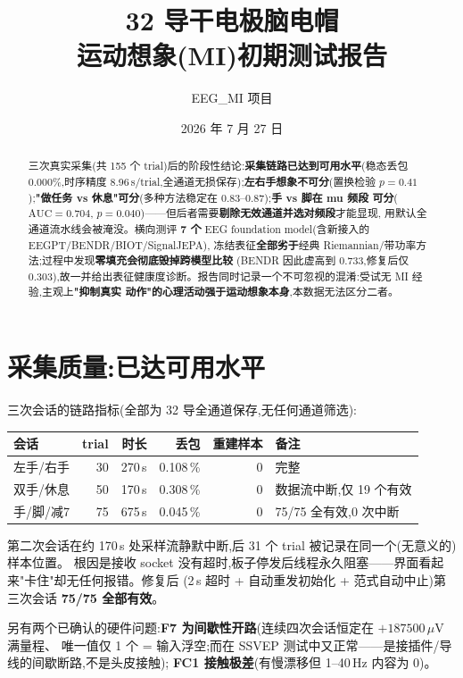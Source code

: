 \documentclass[11pt]{ctexart}
\title{\bfseries 32 导干电极脑电帽\\运动想象(MI)初期测试报告}
\author{EEG\_MI 项目}
\date{2026 年 7 月 27 日}
\begin{document}
\maketitle

\begin{abstract}
\noindent
三次真实采集(共 155 个 trial)后的阶段性结论:\textbf{采集链路已达到可用水平}(稳态丢包
0.000\%,时序精度 8.96\,s/trial,全通道无损保存);\textbf{左右手想象不可分}(置换检验
$p=0.41$);\textbf{"做任务 vs 休息"可分}(多种方法稳定在 0.83–0.87);\textbf{手 vs 脚在 mu 频段
可分}($\mathrm{AUC}=0.704$, $p=0.040$)——但后者需要\textbf{剔除无效通道并选对频段}才能显现,
用默认全通道流水线会被淹没。横向测评 \textbf{7 个} EEG foundation model(含新接入的 EEGPT/BENDR/BIOT/SignalJEPA),
冻结表征\textbf{全部劣于}经典 Riemannian/带功率方法;过程中发现\textbf{零填充会彻底毁掉跨模型比较}
(BENDR 因此虚高到 0.733,修复后仅 0.303),故一并给出表征健康度诊断。报告同时记录一个不可忽视的混淆:受试无 MI 经验,主观上\textbf{"抑制真实
动作"的心理活动强于运动想象本身},本数据无法区分二者。
\end{abstract}

\section{采集质量:已达可用水平}
三次会话的链路指标(全部为 32 导全通道保存,无任何通道筛选):

\begin{center}\small
\begin{tabular}{@{}lrrrrl@{}}
\toprule
会话 & trial & 时长 & 丢包 & 重建样本 & 备注 \\
\midrule
左手/右手      & 30 & 270\,s & 0.108\,\% & 0 & 完整 \\
双手/休息      & 50 & 170\,s & 0.308\,\% & 0 & \textcolor{bad}{数据流中断,仅 19 个有效} \\
手/脚/减7      & 75 & 675\,s & 0.045\,\% & 0 & \textcolor{good}{75/75 全有效,0 次中断} \\
\bottomrule
\end{tabular}
\end{center}

第二次会话在约 170\,s 处采样流静默中断,后 31 个 trial 被记录在同一个(无意义的)样本位置。
根因是接收 socket 没有超时,板子停发后线程永久阻塞——界面看起来"卡住"却无任何报错。修复后
(2\,s 超时 + 自动重发初始化 + 范式自动中止)第三次会话 \textbf{75/75 全部有效}。

另有两个已确认的硬件问题:\textbf{F7 为间歇性开路}(连续四次会话恒定在 $+187500\,\mu$V 满量程、
唯一值仅 1 个 = 输入浮空;而在 SSVEP 测试中又正常——是接插件/导线的间歇断路,不是头皮接触);
\textbf{FC1 接触极差}(有慢漂移但 1–40\,Hz 内容为 0)。
\end{document}
